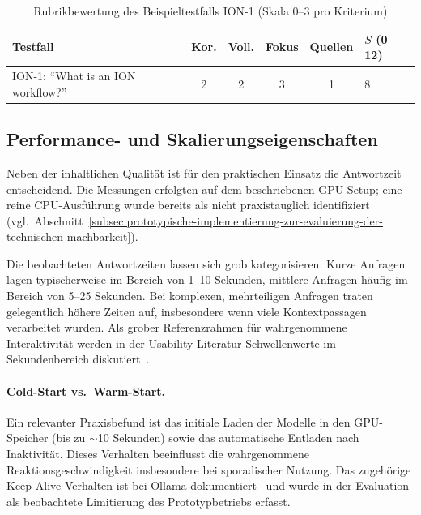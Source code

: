 \vspace{1cm}
\FloatBarrier
\begin{table}[htbp]
    \centering
    \small
    \begin{tabular}{p{4.6cm}ccccp{2.0cm}}
        \toprule
        \textbf{Testfall} & \textbf{Kor.} & \textbf{Voll.} & \textbf{Fokus} & \textbf{Quellen} & \textbf{$S$ (0--12)} \\
        \midrule
        ION-1: \enquote{What is an ION workflow?} & 2 & 2 & 3 & 1 & 8 \\
        \bottomrule
    \end{tabular}
    \caption{Rubrikbewertung des Beispieltestfalls ION-1 (Skala 0--3 pro Kriterium)}
    \label{tab:eval-scores-ion}
\end{table}
\FloatBarrier
\vspace{1cm}
\subsection{Performance- und Skalierungseigenschaften}\label{subsec:performance-evaluation}

Neben der inhaltlichen Qualität ist für den praktischen Einsatz die Antwortzeit entscheidend.
Die Messungen erfolgten auf dem beschriebenen GPU-Setup; eine reine CPU-Ausführung wurde bereits als nicht praxistauglich identifiziert (vgl.\ Abschnitt~\ref{subsec:prototypische-implementierung-zur-evaluierung-der-technischen-machbarkeit}).

Die beobachteten Antwortzeiten lassen sich grob kategorisieren:
Kurze Anfragen lagen typischerweise im Bereich von 1--10 Sekunden, mittlere Anfragen häufig im Bereich von 5--25 Sekunden.
Bei komplexen, mehrteiligen Anfragen traten gelegentlich höhere Zeiten auf, insbesondere wenn viele Kontextpassagen verarbeitet wurden.
Als grober Referenzrahmen für wahrgenommene Interaktivität werden in der Usability-Literatur Schwellenwerte im Sekundenbereich diskutiert~\cite{nielsen_response_times}.

\paragraph{Cold-Start vs.\ Warm-Start.}
Ein relevanter Praxisbefund ist das initiale Laden der Modelle in den GPU-Speicher (bis zu $\sim$10 Sekunden) sowie das automatische Entladen nach Inaktivität.
Dieses Verhalten beeinflusst die wahrgenommene Reaktionsgeschwindigkeit insbesondere bei sporadischer Nutzung.
Das zugehörige Keep-Alive-Verhalten ist bei Ollama dokumentiert~\cite{ollama_keepalive} und wurde in der Evaluation als beobachtete Limitierung des Prototypbetriebs erfasst.


